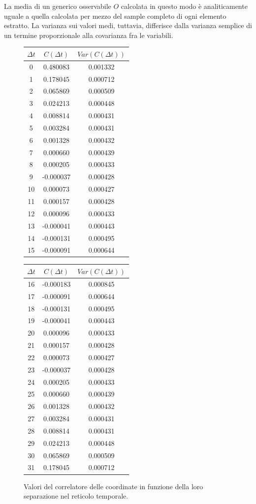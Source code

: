 La media di un generico osservabile $O$ calcolata in questo modo è analiticamente uguale a quella calcolata per mezzo del sample completo di ogni elemento estratto. La varianza sui valori medi, tuttavia, differisce dalla varianza semplice di un termine proporzionale alla covarianza fra le variabili.
\\

\begin{figure}[H]
\centering
\begin{tabular}{|c|c|c|}
\hline
$\Delta t$ & $C(\Delta t)$ & $Var(C(\Delta t))$\\
\hline
0 & 0.480083 & 0.001332\\
1 & 0.178045 & 0.000712\\
2 & 0.065869 & 0.000509\\
3 & 0.024213 & 0.000448\\
4 & 0.008814 & 0.000431\\
5 & 0.003284 & 0.000431\\
6 & 0.001328 & 0.000432\\
7 & 0.000660 & 0.000439\\
8 & 0.000205 & 0.000433\\
9 & -0.000037 & 0.000428\\
10 & 0.000073 & 0.000427\\
11 & 0.000157 & 0.000428\\
12 & 0.000096 & 0.000433\\
13 & -0.000041 & 0.000443\\
14 & -0.000131 & 0.000495\\
15 & -0.000091 & 0.000644\\

\hline
\end{tabular}
\quad
\begin{tabular}{|c|c|c|}
\hline
$\Delta t$ & $C(\Delta t)$ & $Var(C(\Delta t))$\\
\hline
16 & -0.000183 & 0.000845\\
17 & -0.000091 & 0.000644\\
18 & -0.000131 & 0.000495\\
19 & -0.000041 & 0.000443\\
20 & 0.000096 & 0.000433\\
21 & 0.000157 & 0.000428\\
22 & 0.000073 & 0.000427\\
23 & -0.000037 & 0.000428\\
24 & 0.000205 & 0.000433\\
25 & 0.000660 & 0.000439\\
26 & 0.001328 & 0.000432\\
27 & 0.003284 & 0.000431\\
28 & 0.008814 & 0.000431\\
29 & 0.024213 & 0.000448\\
30 & 0.065869 & 0.000509\\
31 & 0.178045 & 0.000712\\
\hline
\end{tabular}
\caption{Valori del correlatore delle coordinate in funzione della loro separazione nel reticolo temporale.}
\label{tab:correlation}
\end{figure}

